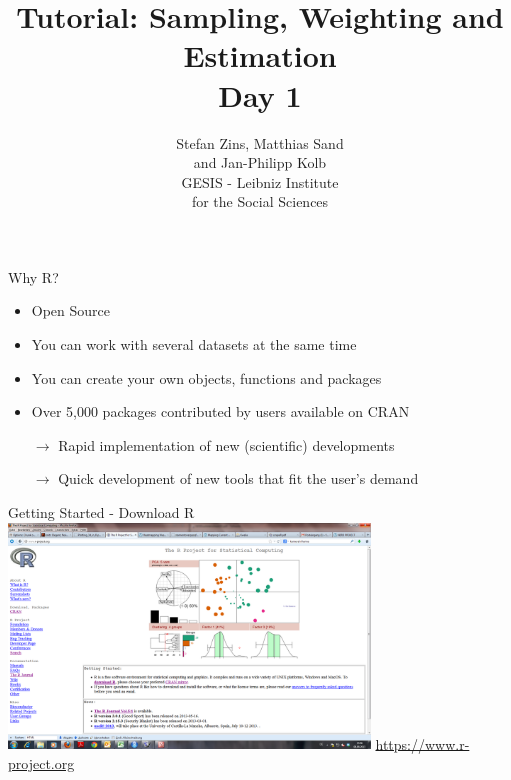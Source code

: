 \documentclass[11pt,german,hideothersubsections]{beamer}
\title[Day 1]{Tutorial: Sampling, Weighting and Estimation\\ \Large{Day 1} }
\author[M. Sand]{Stefan Zins, Matthias Sand\\ and Jan-Philipp Kolb\\ \vspace{.5cm} \footnotesize{GESIS - Leibniz Institute\\ for the Social Sciences}}
\date[]{\color{dunkelgrau}\footnotesize%
\begin{minipage}{8cm}%
\begin{center}%
\scriptsize{
\textbf{GESIS Summer School}\\ \tiny{Cologne, Germany}%
}\\
\vspace{0.25cm}
\textbf{August 24th, 2015}%

\end{center}%
\end{minipage}}%
\begin{document}

\maketitle



\begin{frame}[fragile]{Why R?}
\begin{itemize}
\item Open Source 
\vspace{.25cm}
\item You can work with several datasets at the same time
\vspace{.25cm}
\item You can create your own objects, functions and packages
\vspace{.25cm}
\item Over 5,000 packages contributed by users available on CRAN
\vspace{.25cm}
\item[$\rightarrow$] Rapid implementation of new (scientific) developments
\vspace{.25cm}
\item[$\rightarrow$] Quick development of new tools that fit the user's demand
\end{itemize}
\end{frame}
\begin{frame}[fragile]{Getting Started - Download R}
\includegraphics[width=\linewidth, height=6cm]{../figure/Rproject.png}
\vspace{.5cm}
\centering
\url{https://www.r-project.org}

\end{frame}
\end{document}
